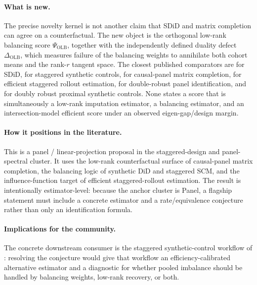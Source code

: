 \documentclass[11pt]{article}
\theoremstyle{definition}
\theoremstyle{plain}
\theoremstyle{remark}
\begin{document}
\paragraph{What is new.}
The precise novelty kernel is not another claim that SDiD and matrix completion can agree on a counterfactual.  The new object is the orthogonal low-rank balancing score \(\Psi_{\mathrm{OLB}}\), together with the independently defined duality defect \(\Delta_{\mathrm{OLB}}\), which measures failure of the balancing weights to annihilate both cohort means and the rank-\(r\) tangent space.  The closest published comparators are \citet[Sections 2--3]{ArkhangelskyAtheyHirshbergImbensWager2021} for SDiD, \citet[Section 2.2 and Theorem 1]{BenMichaelFellerRothstein2022} for staggered synthetic controls, \citet[Sections 2--3]{AtheyBayatiDoudchenkoImbensKhosravi2021} for causal-panel matrix completion, \citet[Sections 3--4]{RothSantAnna2021} for efficient staggered rollout estimation, \citet[Sections 2--3]{ArkhangelskyImbens2022} for double-robust panel identification, and \citet[Sections 2--3]{QiuShiMiaoWangDobribanTchetgen2024} for doubly robust proximal synthetic controls.  None states a score that is simultaneously a low-rank imputation estimator, a balancing estimator, and an intersection-model efficient score under an observed eigen-gap/design margin.

\paragraph{How it positions in the literature.}
This is a panel / linear-projection proposal in the staggered-design and panel-spectral cluster.  It uses the low-rank counterfactual surface of causal-panel matrix completion, the balancing logic of synthetic DiD and staggered SCM, and the influence-function target of efficient staggered-rollout estimation.  The result is intentionally estimator-level: because the anchor cluster is Panel, a flagship statement must include a concrete estimator and a rate/equivalence conjecture rather than only an identification formula.

\paragraph{Implications for the community.}
The concrete downstream consumer is the staggered synthetic-control workflow of \citet{BenMichaelFellerRothstein2022}: resolving the conjecture would give that workflow an efficiency-calibrated alternative estimator and a diagnostic for whether pooled imbalance should be handled by balancing weights, low-rank recovery, or both.
\end{document}
